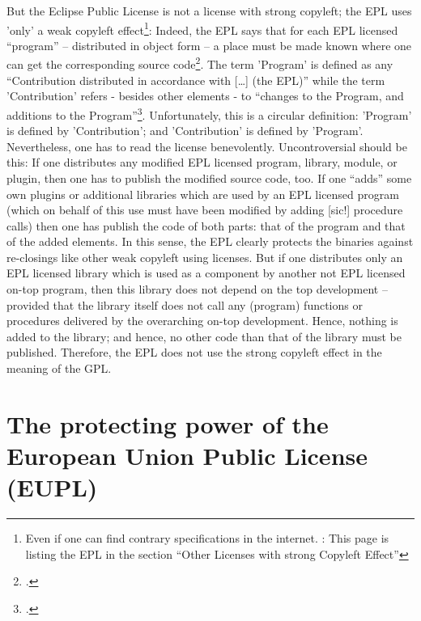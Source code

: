 But the Eclipse Public License is not a license with strong copyleft; the EPL
uses 'only' a weak copyleft effect\footnote{Even if one can find contrary
specifications in the internet. \cite[Pars pro toto cf.][\nopage wp
]{ifross2011a}: This page is listing the EPL in the section \enquote{Other
Licenses with strong Copyleft Effect}}: Indeed, the EPL says that for each EPL
licensed \enquote{program} -- distributed in object form -- a place must be made
known where one can get the corresponding source code\footcite[cf.][\nopage wp
§3, esp. §3.b.iv]{Epl10OsiLicense2005a}. The term 'Program' is defined as any
\enquote{Contribution distributed in accordance with [\ldots] (the EPL)} while
the term 'Contribution' refers - besides other elements - to \enquote{changes to
the Program, and additions to the Program}\footcite[cf.][\nopage wp
§1]{Epl10OsiLicense2005a}. Unfortunately, this is a circular definition:
'Program' is defined by 'Contribution'; and 'Contribution' is defined by
'Program'. Nevertheless, one has to read the license benevolently.
Uncontroversial should be this: If one distributes any modified EPL licensed
program, library, module, or plugin, then one has to publish the modified source
code, too. If one \enquote{adds} some own plugins or additional libraries which
are used by an EPL licensed program (which on behalf of this use must have been
modified by adding [sic!] procedure calls) then one has publish the code of both
parts: that of the program and that of the added elements. In this sense, the
EPL clearly protects the binaries against re-closings like other weak copyleft
using licenses. But if one distributes only an EPL licensed library which is
used as a component by another not EPL licensed on-top program, then this
library does not depend on the top development -- provided that the library
itself does not call any (program) functions or procedures delivered by the
overarching on-top development. Hence, nothing is added to the library; and
hence, no other code than that of the library must be published. Therefore, the
EPL does not use the strong copyleft effect in the meaning of the GPL.
 
\section{The protecting power of the European Union Public License (EUPL)}
\label{sec:ProtectingPowerOfEupl}

